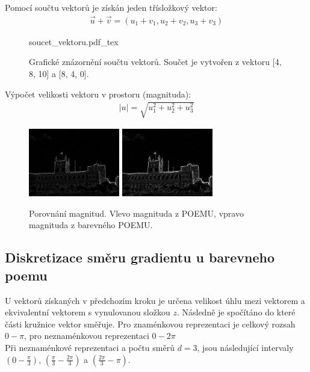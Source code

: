 \documentclass{report}
\begin{document}
Pomocí součtu vektorů je získán jeden třísložkový vektor:
\begin{align}
   \label{soucet_vektrou} \vec{u} + \vec{v} = (u_1 + v_1, u_2 + v_2, u_3 + v_3 )
\end{align} 

\begin{figure}[H]
    \centering    
    \def\svgwidth{\columnwidth}
	{soucet_vektoru.pdf_tex}    
    \caption{Grafické znázornění součtu vektorů. Součet je vytvořen z vektoru [4, 8, 10] a [8, 4, 0].}
    \label{fig: soucet_vektoru}
\end{figure}


Výpočet velikosti vektoru v prostoru (magnituda):
\begin{align}
   \label{velikost_vektoru_v_prostoru} |u| = \sqrt{u_1^2 + u_2^2 + u_3^2}
\end{align} 

\begin{figure}[H]
		\centering
		\includegraphics[width=150px]{./img/magnitude.jpg}	
		\includegraphics[width=150px]{./img/magnitude_3.jpg}	
		\caption{Porovnání magnitud. Vlevo magnituda z POEMU, vpravo magnituda z barevného POEMU.}
\end{figure}


\subsection{Diskretizace směru gradientu u barevneho poemu}
U vektorů získaných v předchozím kroku je určena velikost úhlu mezi vektorem a ekvivalentní vektorem s vynulovanou složkou $z$. Následně je spočítáno do které části kružnice vektor směřuje. Pro znaménkovou reprezentaci je celkový rozsah $0 - \pi$, pro neznaménkovou reprezentaci $0 - 2\pi$
\\
Při neznaménkové reprezentaci a počtu směrů $d = 3$, jsou následující intervaly $\left(0 - \frac{\pi}{3}\right)$, $\left(\frac{\pi}{3} - \frac{2\pi}{3}\right)$ a  $\left(\frac{2\pi}{3} - \pi\right)$.
\end{document}
